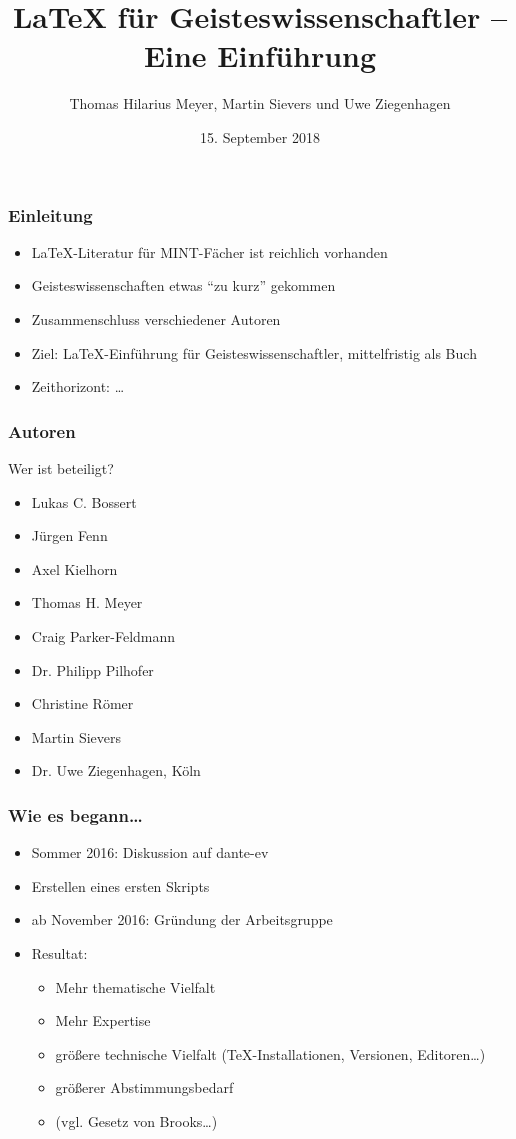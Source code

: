\documentclass[12pt,ngerman]{beamer}
\title{\LaTeX{} für Geisteswissenschaftler -- Eine Einführung}
\date{15. September 2018}
\author{Thomas Hilarius Meyer, Martin Sievers und Uwe Ziegenhagen}
\begin{document}
\begin{frame}
	 \maketitle
\end{frame}

\begin{frame}
\frametitle{Einleitung}

\begin{itemize}
\item \LaTeX-Literatur für MINT-Fächer ist reichlich vorhanden
\item Geisteswissenschaften etwas \enquote{zu kurz} gekommen
\item Zusammenschluss verschiedener Autoren
\item Ziel: \LaTeX-Einführung für Geisteswissenschaftler, mittelfristig als Buch
\item Zeithorizont: \ldots
\end{itemize}

\end{frame}

\begin{frame}
\frametitle{Autoren}

Wer ist beteiligt?

\begin{itemize}
\item Lukas C. Bossert
\item Jürgen Fenn
\item Axel Kielhorn
\item Thomas H. Meyer
\item Craig Parker-Feldmann
\item Dr. Philipp Pilhofer
\item Christine Römer
\item Martin Sievers
\item Dr. Uwe Ziegenhagen, Köln
\end{itemize}
\end{frame}

\begin{frame}
\frametitle{Wie es begann\ldots}

\begin{itemize}
\item Sommer 2016: Diskussion auf dante-ev
\item Erstellen eines ersten Skripts
\item ab November 2016: Gründung der Arbeitsgruppe
\item Resultat:
  \begin{itemize}
  \item Mehr thematische Vielfalt
  \item Mehr Expertise
  \item größere technische Vielfalt (\TeX-Installationen, Versionen, Editoren\ldots)
  \item größerer Abstimmungsbedarf
  \item (vgl. Gesetz von Brooks\ldots)
  \end{itemize}
\end{itemize}
\end{frame}
\end{document}

